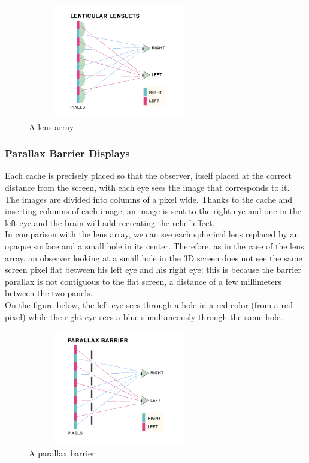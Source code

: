 \begin{figure}[h!]
\begin{center}
\begin{minipage}{1\linewidth}
\centering\includegraphics[width=8cm,height=5cm]{image/lentuc.png}
\caption{A lens array\cite{glasses-free3D}}
\end{minipage}
\end{center}
\end{figure}

\subsubsection{Parallax Barrier Displays}

Each cache is precisely placed so that the observer, itself placed at the correct distance from the screen, with each eye sees the image that corresponds to it. The images are divided into columns of a pixel wide. Thanks to the cache and inserting columns of each image, an image is sent to the right eye and one in the left eye and the brain will add recreating the relief effect.\\
In comparison with the lens array, we can see each spherical lens replaced by an opaque surface and a small hole in its center. Therefore, as in the case of the lens array, an observer looking at a small hole in the 3D screen does not see the same screen pixel flat between his left eye and his right eye: this is because the barrier parallax is not contiguous to the flat screen, a distance of a few millimeters between the two panels.\\
On the figure below, the left eye sees through a hole in a red color (from a red pixel) while the right eye sees a blue simultaneously through the same hole.
\clearpage

\begin{figure}[h!]
\begin{center}
\begin{minipage}{1\linewidth}
\centering\includegraphics[width=8cm,height=5cm]{image/parallax.png}
\caption{A parallax barrier\cite{glasses-free3D}}
\end{minipage}
\end{center}
\end{figure}

